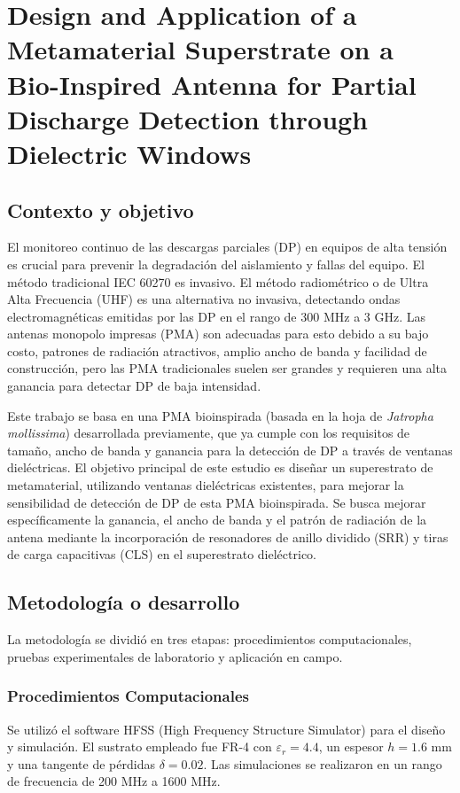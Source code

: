 \documentclass[11pt,a4paper]{article}
\begin{document}
\newpage
\section{Design and Application of a Metamaterial Superstrate on a Bio-Inspired Antenna for Partial Discharge Detection through Dielectric Windows}

\subsection*{Contexto y objetivo}
El monitoreo continuo de las descargas parciales (DP) en equipos de alta tensión es crucial para prevenir la degradación del aislamiento y fallas del equipo. El método tradicional IEC 60270 es invasivo. El método radiométrico o de Ultra Alta Frecuencia (UHF) es una alternativa no invasiva, detectando ondas electromagnéticas emitidas por las DP en el rango de 300 MHz a 3 GHz. Las antenas monopolo impresas (PMA) son adecuadas para esto debido a su bajo costo, patrones de radiación atractivos, amplio ancho de banda y facilidad de construcción, pero las PMA tradicionales suelen ser grandes y requieren una alta ganancia para detectar DP de baja intensidad.

Este trabajo se basa en una PMA bioinspirada (basada en la hoja de \textit{Jatropha mollissima}) desarrollada previamente, que ya cumple con los requisitos de tamaño, ancho de banda y ganancia para la detección de DP a través de ventanas dieléctricas. El objetivo principal de este estudio es diseñar un superestrato de metamaterial, utilizando ventanas dieléctricas existentes, para mejorar la sensibilidad de detección de DP de esta PMA bioinspirada. Se busca mejorar específicamente la ganancia, el ancho de banda y el patrón de radiación de la antena mediante la incorporación de resonadores de anillo dividido (SRR) y tiras de carga capacitivas (CLS) en el superestrato dieléctrico.

\subsection*{Metodología o desarrollo}
La metodología se dividió en tres etapas: procedimientos computacionales, pruebas experimentales de laboratorio y aplicación en campo.

\subsubsection*{Procedimientos Computacionales}
Se utilizó el software HFSS (High Frequency Structure Simulator) para el diseño y simulación. El sustrato empleado fue FR-4 con $\varepsilon_r = 4.4$, un espesor $h = 1.6$ mm y una tangente de pérdidas $\delta = 0.02$. Las simulaciones se realizaron en un rango de frecuencia de 200 MHz a 1600 MHz.
\end{document}
